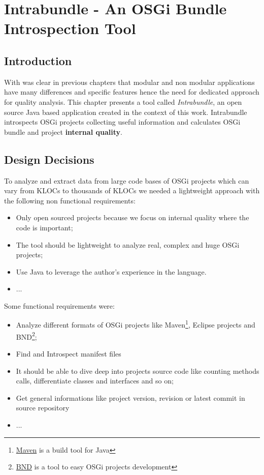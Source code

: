 \chapter{Intrabundle - An OSGi Bundle Introspection Tool}


\section{Introduction}
With was clear in previous chapters that modular and non modular applications have many differences and specific features hence the need for dedicated approach for quality analysis. This chapter presents a tool called \emph{Intrabundle}\citep{intrabundle github 2014}, an open source Java based application created in the context of this work. Intrabundle introspects OSGi projects collecting useful information and calculates OSGi bundle and project \textbf{internal quality}.  


\section{Design Decisions}
To analyze and extract data from large code bases of OSGi projects which can vary from KLOCs to thousands of KLOCs we needed a lightweight approach with the following non functional requirements:

\begin{itemize}
\item Only open sourced projects because we focus on internal quality where the code is important;
\item The tool should be lightweight to analyze real, complex and huge OSGi projects;
\item Use Java to leverage the author's experience in the language.
\item ...
\end{itemize}

Some functional requirements were:

\begin{itemize}
\item Analyze different formats of OSGi projects like Maven\footnote{\href{http://maven.apache.org/index.html}{Maven} is a build tool for Java}, 
Eclipse projects and BND\footnote{\href{http://bndtools.org/}{BND} is a tool to easy OSGi projects development}; 
\item Find and Introspect manifest files
\item It should be able to dive deep into projects source code like counting methods calls, differentiate classes and interfaces and so on;  
\item Get general informations like project version, revision or latest commit in source repository
\item ...
\end{itemize}

